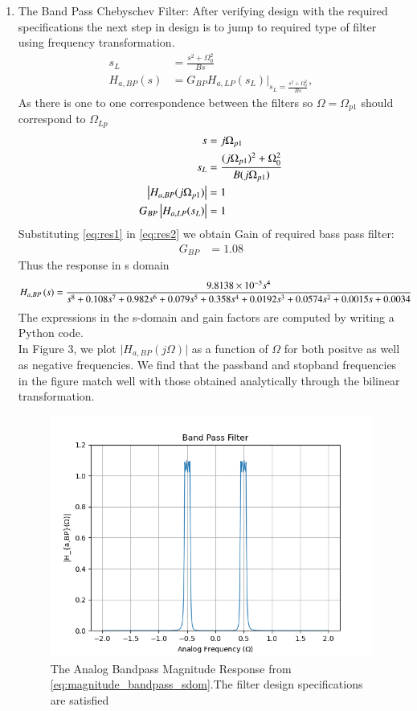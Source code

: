 \documentclass{article}
\begin{document}
\begin{enumerate}
\item {The Band Pass Chebyschev Filter:} 
After verifying design with the required specifications the next step in design is to jump to required type of filter using frequency transformation. 
\begin{align}
    s_L &= \frac{s^2 + \Omega_0^2}{Bs} \\
    H_{a,BP}(s) &= G_{BP}H_{a,LP}(s_L)\vert_{s_L = \frac{s^2 + \Omega_0^2}{Bs}},
\end{align}
As there is one to one correspondence between the filters so $\Omega=\Omega_{p1}$ should correspond to $\Omega_{Lp}$
\begin{align}
    s &= j\Omega_{p1}\\
    s_{L} &= \frac{(j\Omega_{p1})^2 + \Omega_0^2}{B(j\Omega_{p1})} \label{eq:res1} \\ 
    \left\vert H_{a,BP}(j\Omega_{p1})\right\vert &= 1 \\
    G_{BP}\left\vert H_{a,LP}(s_L)\right\vert &= 1 \label{eq:res2}
\end{align}
Substituting \eqref{eq:res1} in \eqref{eq:res2} we obtain Gain of required bass pass filter:
\begin{align}
    G_{BP} &= 1.08 
\end{align}
Thus the response in s domain 
\begin{align}
    H_{a,BP}\left(s\right) &= \frac{9.8138\times 10^{-5}s^4}{s^8 + 0.108s^7 + 0.982s^6 + 0.079s^5 + 0.358s^4 + 0.0192s^3 + 0.0574s^2 + 0.0015s + 0.0034} \label{eq:magnitude_bandpass_sdom}
\end{align}
The expressions in the s-domain and gain factors are computed by writing a Python code. \\
In Figure 3, we plot $\vert H_{a,BP}(j\Omega)\vert$ as a function of $\Omega$ for both positve as
well as negative frequencies.  We find that the passband and stopband frequencies in the figure
match well with those obtained analytically through the bilinear transformation.
\begin{figure}[H]
\centering
\includegraphics[width=1\columnwidth]{figs/bp_filt.png}
\caption{The Analog Bandpass Magnitude Response from \eqref{eq:magnitude_bandpass_sdom}.The filter design specifications are satisfied}
\label{fig:band_pass_filter}
\end{figure}
\end{enumerate}
\end{document}
